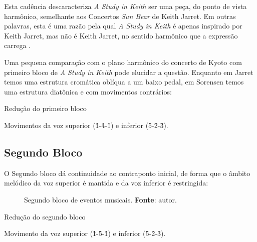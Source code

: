 Esta cadência descaracteriza \emph{A Study in Keith} ser uma peça, do ponto de vista harmônico, semelhante aos Concertos \emph{Sun Bear} de Keith Jarret. Em outras palavras, esta é uma razão pela qual \emph{A Study in Keith} é apenas inspirado por Keith Jarret, mas não é Keith Jarret, no sentido harmônico que a expressão carrega .

Uma pequena comparação com o plano harmônico do concerto de Kyoto  com primeiro bloco de \emph{A Study in Keith} pode elucidar a questão. Enquanto em Jarret temos uma estrutura cromática oblíqua a um baixo pedal, em Sorensen temos uma estrutura diatônica e com movimentos contrários:


\begin{example}{Redução do primeiro bloco}\label{fig:neumaMD1}



Movimentos da voz superior (\^1-\^4-\^1) e inferior (\^5-\^2-\^3).

  \centering{}

\end{example}

\subsection{Segundo Bloco}

O Segundo bloco dá continuidade ao contraponto inicial, de forma que o âmbito melódico da voz superior é mantida e da voz inferior é restringida:

\begin{figure}[!h]
  \centering
  
  \caption{Segundo bloco de eventos musicais. \textbf{Fonte}: autor.}
  \label{fig:ask4}
\end{figure}


\begin{example}{Redução do segundo bloco}\label{fig:neumaMD2}



Movimento da voz superior (\^1-\^5-\^1) e inferior (\^5-\^2-\^3).

  \centering{}
\end{example}

